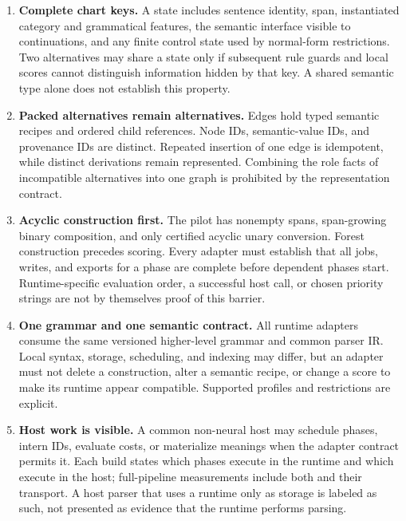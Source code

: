 \documentclass[11pt,a4paper]{article}
\begin{document}
\begin{enumerate}
\item \textbf{Complete chart keys.} A state includes sentence identity, span, instantiated category and grammatical features, the semantic interface visible to continuations, and any finite control state used by normal-form restrictions. Two alternatives may share a state only if subsequent rule guards and local scores cannot distinguish information hidden by that key. A shared semantic type alone does not establish this property.
\item \textbf{Packed alternatives remain alternatives.} Edges hold typed semantic recipes and ordered child references. Node IDs, semantic-value IDs, and provenance IDs are distinct. Repeated insertion of one edge is idempotent, while distinct derivations remain represented. Combining the role facts of incompatible alternatives into one graph is prohibited by the representation contract.
\item \textbf{Acyclic construction first.} The pilot has nonempty spans,
span-growing binary composition, and only certified acyclic unary conversion.
Forest construction precedes scoring. Every adapter must establish that all
jobs, writes, and exports for a phase are complete before dependent phases
start. Runtime-specific evaluation order, a successful host call, or chosen
priority strings are not by themselves proof of this barrier.

\item \textbf{One grammar and one semantic contract.} All runtime adapters
consume the same versioned higher-level grammar and common parser IR. Local
syntax, storage, scheduling, and indexing may differ, but an adapter must not
delete a construction, alter a semantic recipe, or change a score to make its
runtime appear compatible. Supported profiles and restrictions are explicit.

\item \textbf{Host work is visible.} A common non-neural host may schedule
phases, intern IDs, evaluate costs, or materialize meanings when the adapter
contract permits it. Each build states which phases execute in the runtime
and which execute in the host; full-pipeline measurements include both and
their transport. A host parser that uses a runtime only as storage is labeled
as such, not presented as evidence that the runtime performs parsing.


\end{enumerate}
\end{document}

